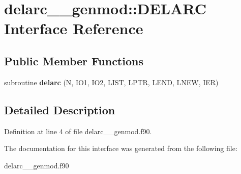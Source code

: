 \hypertarget{interfacedelarc____genmod_1_1_d_e_l_a_r_c}{\section{delarc\+\_\+\+\_\+genmod\+:\+:D\+E\+L\+A\+R\+C Interface Reference}
\label{interfacedelarc____genmod_1_1_d_e_l_a_r_c}
}
\subsection*{Public Member Functions}
\begin{DoxyCompactItemize}
\item 
\hypertarget{interfacedelarc____genmod_1_1_d_e_l_a_r_c_aaa35750f2976f8927dee925332d6571a}{subroutine {\bfseries delarc} (N, I\+O1, I\+O2, L\+I\+S\+T, L\+P\+T\+R, L\+E\+N\+D, L\+N\+E\+W, I\+E\+R)}\label{interfacedelarc____genmod_1_1_d_e_l_a_r_c_aaa35750f2976f8927dee925332d6571a}

\end{DoxyCompactItemize}


\subsection{Detailed Description}


Definition at line 4 of file delarc\+\_\+\+\_\+genmod.\+f90.



The documentation for this interface was generated from the following file\+:\begin{DoxyCompactItemize}
\item 
delarc\+\_\+\+\_\+genmod.\+f90\end{DoxyCompactItemize}
